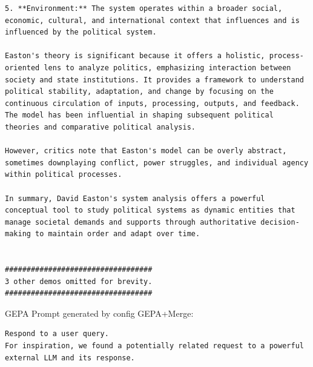 \begin{instructbox}
\begin{lstlisting}[breakindent=0pt, breaklines=true, breakatwhitespace=true, frame=single, backgroundcolor=\color{green!10}]
5. **Environment:** The system operates within a broader social, economic, cultural, and international context that influences and is influenced by the political system.

Easton's theory is significant because it offers a holistic, process-oriented lens to analyze politics, emphasizing interaction between society and state institutions. It provides a framework to understand political stability, adaptation, and change by focusing on the continuous circulation of inputs, processing, outputs, and feedback. The model has been influential in shaping subsequent political theories and comparative political analysis.

However, critics note that Easton's model can be overly abstract, sometimes downplaying conflict, power struggles, and individual agency within political processes.

In summary, David Easton's system analysis offers a powerful conceptual tool to study political systems as dynamic entities that manage societal demands and supports through authoritative decision-making to maintain order and adapt over time.


##################################
3 other demos omitted for brevity.
##################################

\end{lstlisting}

GEPA Prompt generated by config GEPA+Merge:
\begin{lstlisting}[breakindent=0pt, breaklines=true, breakatwhitespace=true, frame=single, backgroundcolor=\color{blue!10}]
Respond to a user query.
For inspiration, we found a potentially related request to a powerful external LLM and its response.
\end{lstlisting}
\end{instructbox}
